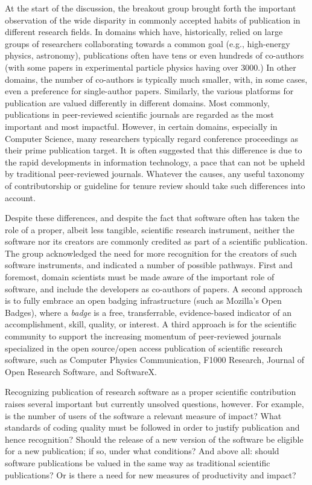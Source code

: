 \documentclass[11pt, oneside]{amsart}
\begin{document}
At the start of the discussion, the breakout group brought forth the important
observation of the wide disparity in commonly accepted habits of publication in
different research fields. In domains which have, historically, relied on large
groups of researchers collaborating towards a common goal (e.g., high-energy
physics, astronomy), publications often have tens or even hundreds of co-authors
(with some papers in experimental particle physics having over 3000.) In other
domains, the number of co-authors is typically much smaller, with, in some
cases, even a preference for single-author papers. Similarly, the various
platforms for publication are valued differently in different domains. Most
commonly, publications in peer-reviewed scientific journals are regarded as the
most important and most impactful. However, in certain domains, especially in
Computer Science, many researchers typically regard conference proceedings as
their prime publication target. It is often suggested that this difference is
due to the rapid developments in information technology, a pace that can not be
upheld by traditional peer-reviewed journals. Whatever the causes, any useful
taxonomy of contributorship or guideline for tenure review should take such
differences into account.

Despite these differences, and despite the fact that software often has taken
the role of a proper, albeit less tangible, scientific research instrument,
neither the software nor its creators are commonly credited as part of a
scientific publication. The group acknowledged the need for more recognition for
the creators of such software instruments, and indicated a number of possible
pathways. First and foremost, domain scientists must be made aware of the
important role of software, and include the developers as co-authors of papers.
A second approach is to fully embrace an open badging infrastructure (such as
Mozilla's Open Badges), where a {\em badge} is a free, transferrable,
evidence-based indicator of an accomplishment, skill, quality, or interest. A
third approach is for the scientific community to support the increasing
momentum of peer-reviewed journals specialized in the open source/open access
publication of scientific research software, such as Computer Physics
Communication, F1000 Research, Journal of Open Research Software, and SoftwareX.

Recognizing publication of research software as a proper scientific contribution
raises several important but currently unsolved questions, however. For example,
is the number of users of the software a relevant measure of impact? What
standards of coding quality must be followed in order to justify publication and
hence recognition? Should the release of a new version of the software be
eligible for a new publication; if so, under what conditions? And above all:
should software publications be valued in the same way as traditional scientific
publications? Or is there a need for new measures of productivity and impact?
\end{document}
